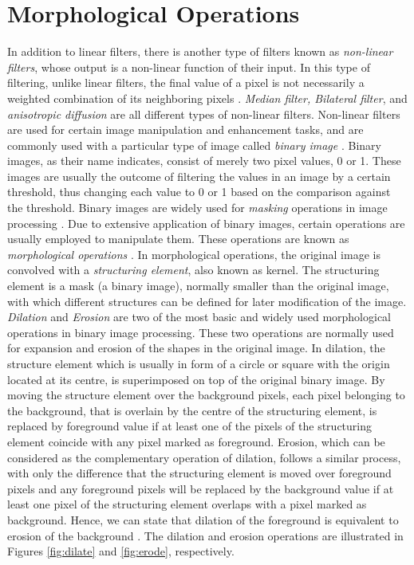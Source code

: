 \section{Morphological Operations}
In addition to linear filters, there is another type of filters known as {\it non-linear filters}, whose output is a non-linear function of their input. 
In this type of filtering, unlike linear filters, the final value of a pixel is not necessarily 
a weighted combination of its neighboring pixels \cite{sze11}. 
{\it Median filter, Bilateral filter}, and {\it anisotropic diffusion} are all different types of non-linear filters. Non-linear filters are used for certain image manipulation 
and enhancement tasks, and are commonly used with a particular type of image called {\it binary
image} \cite{sze11}. Binary images, as their name indicates, consist of merely two pixel values, 0 or 1. These images are usually the outcome of filtering the values in an image 
by a certain threshold, thus changing each value to 0 or 1 based on the comparison against the threshold. Binary images are
widely used for {\it masking} operations in image processing \cite{sze11}. Due to extensive application of binary images, certain operations are usually employed to manipulate them. 
These operations are known as {\it morphological operations} \cite{ritt00}.
In morphological operations, the original image is convolved with a {\it structuring element}, also known as kernel. 
The structuring element is a mask (a binary image), normally smaller than the original image, 
with which different structures can be defined for later modification of the image. 
{\it Dilation} and {\it Erosion} are two of the most basic and widely used morphological operations in binary image processing.
These two operations are normally used for expansion and erosion of the shapes in the original image. 
In dilation, the structure element which is usually in form of a circle or square with the origin located at its centre, is superimposed on top of the original binary image.
By moving the structure element over the background pixels, each pixel belonging to the background, that 
is overlain by the centre of the structuring element, is replaced by foreground value if at least one of the pixels of the structuring element coincide with any pixel marked as foreground.
Erosion, which can be considered as the complementary operation of dilation, follows a similar process, with only the difference that the 
structuring element is moved over foreground pixels and any
foreground pixels will be replaced by the background value if at least one pixel of the structuring element overlaps with a pixel marked as background.
Hence, we can state that dilation of the foreground is equivalent to erosion of the background \cite{ritt00}.
The dilation and erosion operations are illustrated in Figures \ref{fig:dilate} and \ref{fig:erode}, respectively.

